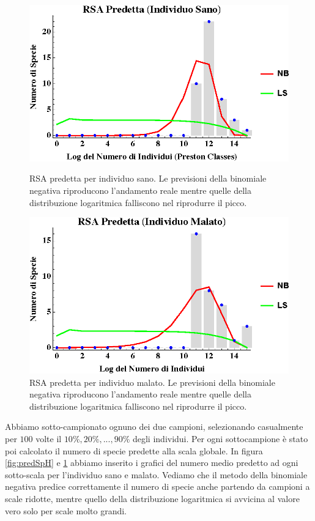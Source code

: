 \begin{figure}[H]
  \centering
  \begin{minipage}[b]{0.45\textwidth}
    \includegraphics[width=\textwidth]{Figure/rsapredH.eps}
    \caption{RSA predetta per individuo sano. Le previsioni della binomiale negativa riproducono l'andamento reale mentre quelle della distribuzione logaritmica falliscono nel riprodurre il picco.}
    \label{fig:rsapredH}
   \end{minipage}
  \hfill
  \begin{minipage}[b]{0.45\textwidth}
    \includegraphics[width=\textwidth]{Figure/rsapredC.eps}
    \caption{RSA predetta per individuo malato. Le previsioni della binomiale negativa riproducono l'andamento reale mentre quelle della distribuzione logaritmica falliscono nel riprodurre il picco.}
    \label{fig:rsapredC}
    \end{minipage}
\end{figure}

Abbiamo sotto-campionato ognuno dei due campioni, selezionando casualmente per $100$ volte il $10 \%, 20 \%,...,90 \%$ degli individui. Per ogni sottocampione è stato poi calcolato il numero di specie predette alla scala globale. In figura \ref{fig:predSpH} e \ref{fig:rsapredC} abbiamo inserito i grafici del numero medio predetto ad ogni sotto-scala per l'individuo sano e malato. Vediamo che il metodo della binomiale negativa predice correttamente il numero di specie anche partendo da campioni a scale ridotte, mentre quello della distribuzione logaritmica si avvicina al valore vero solo per scale molto grandi.

